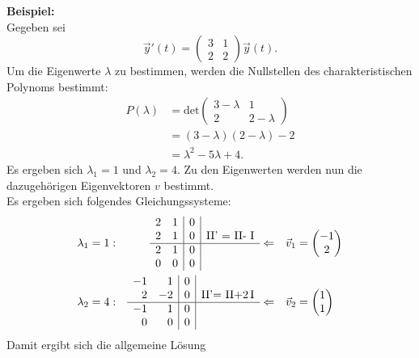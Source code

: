 \noindent
\textbf{Beispiel:}\\
Gegeben sei
$$
\vec y'(t) = \begin{pmatrix} 3 & 1 \\ 2 & 2 \end{pmatrix} \vec y(t).
$$
Um die Eigenwerte $\lambda$ zu bestimmen, werden die Nullstellen des charakteristischen Polynoms bestimmt:
\begin{align*}
P(\lambda) &= \text{det}\begin{pmatrix} 3-\lambda & 1 \\ 2 & 2-\lambda \end{pmatrix} \\
           &= (3-\lambda)(2-\lambda) -2 \\
           &= \lambda^2 -5\lambda +4.
\end{align*}
Es ergeben sich $\lambda_1 = 1$ und $\lambda_2 =4$. Zu den Eigenwerten werden nun die dazugeh\"origen Eigenvektoren $v$ bestimmt. \\
Es ergeben sich folgendes Gleichungssysteme:
\begin{align*}
\lambda_1=1:&&\begin{array}{rr|l|l}
2 & 1 & 0 \\
2 & 1 & 0 & \text{II' = II- I}\\\hline
2 & 1 & 0 \\
0 & 0 & 0 & \\
\end{array}&\Leftarrow&&\vec v_1= \begin{pmatrix}-1\\ 2\end{pmatrix}\\
\lambda_2=4 :&&\begin{array}{rr|l|l}
-1&  1 &  0 & \\
 2& -2 &  0 & \text{II'= II+2\,I}\\\hline
-1&  1 &  0 \\
0& 0 & 0 & \\
\end{array}&\Leftarrow&&\vec v_2= \begin{pmatrix}1   \\1\end{pmatrix}\\
\end{align*}
Damit ergibt sich die allgemeine L\"osung
